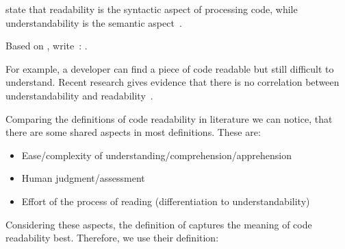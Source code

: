 \documentclass[%
class=scrreprt,
chapterprefix=false,%
open=right,%
twoside=true,%
paper=a4,%
logofile={Logo\_zentral\_farbig\_EN.png},%
thesistype=master,%
UKenglish,%
]{se2thesis}
\theoremstyle{definition}
\begin{document}
	\citeauthor{posnett2011simpler} state that readability is the syntactic aspect of processing code, while understandability is the semantic aspect~\cite{posnett2011simpler}.
	
	Based on \citeauthor{posnett2011simpler}, \citeauthor{scalabrino2018comprehensive} write~\cite{scalabrino2018comprehensive}:
	.
	
	
	For example, a developer can find a piece of code readable but still difficult to understand. Recent research gives evidence that there is no correlation between understandability and readability~\cite{scalabrino2017automatically}.	
	
	
		

	Comparing the definitions of code readability in literature we can notice, that there are some shared aspects in most definitions. These are:
	\begin{itemize}
		\item Ease/complexity of understanding/comprehension/apprehension
		\item Human judgment/assessment
		\item Effort of the process of reading (differentiation to understandability)
	\end{itemize}
	
	Considering these aspects, the definition of \citeauthor{oliveira2020evaluating} captures the meaning of code readability best. Therefore, we use their definition:
	
\end{document}
